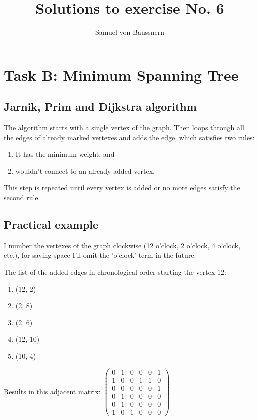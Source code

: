 \documentclass[10pt,a4paper]{article}
\author{Samuel von Baussnern}
\title{Solutions to exercise No. 6}
\begin{document}
\maketitle
\section{Task B: Minimum Spanning Tree}
\subsection{Jarnik, Prim and Dijkstra algorithm}

The algorithm starts with a single vertex of the graph. Then loops through all the edges of already marked vertexes and adds the edge, which satisfies two rules: 
\begin{enumerate}
\item It has the minimum weight, and 
\item wouldn't connect to an already added vertex. 
\end{enumerate}
This step is repeated until every vertex is added or no more edges satisfy the second rule.

\subsection{Practical example}

I number the vertexes of the graph clockwise (12 o'clock, 2 o'clock, 4 o'clock, etc.), for saving space I'll omit the 'o'clock'-term in the future.

The list of the added edges in chronological order starting the vertex 12:
\begin{enumerate}
\item (12, 2)
\item (2, 8)
\item (2, 6)
\item (12, 10)
\item (10, 4)
\end{enumerate}

Results in this adjacent matrix:
$
\left(
\begin{array}{cccccc}
0 & 1 & 0 & 0 & 0 & 1 \\
1 & 0 & 0 & 1 & 1 & 0 \\
0 & 0 & 0 & 0 & 0 & 1 \\
0 & 1 & 0 & 0 & 0 & 0 \\
0 & 1 & 0 & 0 & 0 & 0 \\
1 & 0 & 1 & 0 & 0 & 0
\end{array}
\right)
$
\end{document}
